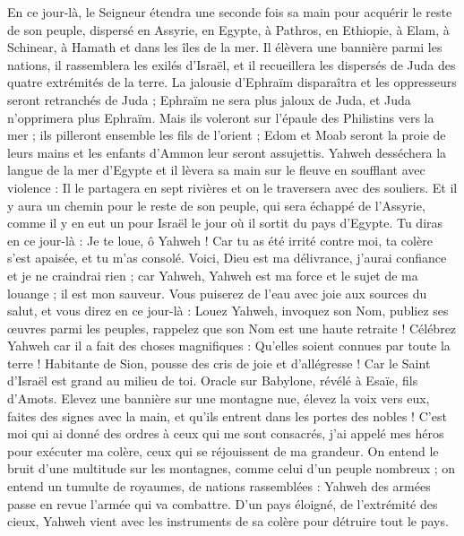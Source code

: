 \begin{multicols}{2}
En ce jour-là, le Seigneur étendra une seconde fois sa main pour acquérir le reste de son peuple, dispersé en Assyrie, en Egypte, à Pathros, en Ethiopie, à Elam, à Schinear, à Hamath et dans les îles de la mer.
Il élèvera une bannière parmi les nations, il rassemblera les exilés d'Israël, et il recueillera les dispersés de Juda des quatre extrémités de la terre.
La jalousie d'Ephraïm disparaîtra et les oppresseurs seront retranchés de Juda ; Ephraïm ne sera plus jaloux de Juda, et Juda n'opprimera plus Ephraïm.
Mais ils voleront sur l'épaule des Philistins vers la mer ; ils pilleront ensemble les fils de l'orient ; Edom et Moab seront la proie de leurs mains et les enfants d'Ammon leur seront assujettis.
Yahweh desséchera la langue de la mer d'Egypte et il lèvera sa main sur le fleuve en soufflant avec violence : Il le partagera en sept rivières et on le traversera avec des souliers.
Et il y aura un chemin pour le reste de son peuple, qui sera échappé de l'Assyrie, comme il y en eut un pour Israël le jour où il sortit du pays d'Egypte.
\VerseOne{}Tu diras en ce jour-là : Je te loue, ô Yahweh ! Car tu as été irrité contre moi, ta colère s'est apaisée, et tu m'as consolé.
Voici, Dieu est ma délivrance, j'aurai confiance et je ne craindrai rien ; car Yahweh, Yahweh est ma force et le sujet de ma louange ; il est mon sauveur.
Vous puiserez de l'eau avec joie aux sources du salut,
et vous direz en ce jour-là : Louez Yahweh, invoquez son Nom, publiez ses œuvres parmi les peuples, rappelez que son Nom est une haute retraite !
Célébrez Yahweh car il a fait des choses magnifiques : Qu'elles soient connues par toute la terre !
Habitante de Sion, pousse des cris de joie et d'allégresse ! Car le Saint d'Israël est grand au milieu de toi.
\VerseOne{}Oracle sur Babylone, révélé à Esaïe, fils d'Amots.
Elevez une bannière sur une montagne nue, élevez la voix vers eux, faites des signes avec la main, et qu'ils entrent dans les portes des nobles !
C'est moi qui ai donné des ordres à ceux qui me sont consacrés, j'ai appelé mes héros pour exécuter ma colère, ceux qui se réjouissent de ma grandeur.
On entend le bruit d'une multitude sur les montagnes, comme celui d'un peuple nombreux ; on entend un tumulte de royaumes, de nations rassemblées : Yahweh des armées passe en revue l'armée qui va combattre.
D'un pays éloigné, de l'extrémité des cieux, Yahweh vient avec les instruments de sa colère pour détruire tout le pays.

\end{multicols}
